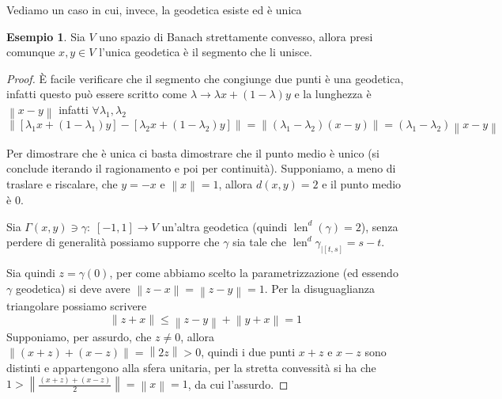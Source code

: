 \documentclass[a4paper,10pt]{article}
\newcounter{counter1}
\theoremstyle{plain}
\theoremstyle{definition}
\newtheorem{mydef}[counter1]{Definizione}
\newtheorem{myes}[counter1]{Esempio}
\theoremstyle{remark}
\newcommand{\pa}[1]{\left(#1\right)}
\newcommand{\bra}[1]{\left[#1\right]}
\newcommand{\norm}[1]{\left\|#1\right\|}
\DeclareMathOperator{\len}{len}
\begin{document}
Vediamo un caso in cui, invece, la geodetica esiste ed è unica
\begin{myes}
  Sia $V$ uno spazio di Banach strettamente convesso, allora presi
  comunque $x,y \in V$ l'unica geodetica è il segmento che li unisce.
\end{myes}
\begin{proof}
  È facile verificare che il segmento che congiunge due punti è una
  geodetica, infatti questo può essere scritto come $\lambda \to
  \lambda x + \pa{1 - \lambda} y$ e la lunghezza è $\norm{x-y}$
  infatti $\forall \lambda _1, \lambda _2$
  \[ \norm{ \bra{ \lambda _1 x + \pa{ 1 - \lambda _1} y } - \bra{
      \lambda _2 x + \pa{ 1 - \lambda _2} y } } = \norm{\pa{\lambda _1
      - \lambda _2 } \pa{ x - y}} = \pa{ \lambda _1 - \lambda _2}
  \norm { x -y} \]

  Per dimostrare che è unica ci basta dimostrare che il punto medio è
  unico (si conclude iterando il ragionamento e poi per
  continuità). Supponiamo, a meno di traslare e riscalare, che $y =
  -x$ e $\norm{x} = 1$, allora $d(x,y) = 2$ e il punto medio è $0$.

  Sia $\Gamma(x,y) \ni \gamma :\; \bra{-1,1} \to V$ un'altra geodetica
  (quindi $\len ^d (\gamma) = 2$), senza perdere di generalità
  possiamo supporre che $\gamma$ sia tale che $\len ^d \gamma_{\mid
    \bra{t,s}} = s -t$.

  Sia quindi $z = \gamma(0)$, per come abbiamo scelto la
  parametrizzazione (ed essendo $\gamma$ geodetica) si deve avere
  $\norm{z-x} = \norm{z-y} = 1$. Per la disuguaglianza triangolare
  possiamo scrivere
  \[ \norm{z+x} \le \norm{z-y} + \norm{y+x} = 1 \]
  Supponiamo, per assurdo, che $z \neq 0$, allora $\norm{\pa{x+z} +
    \pa{x-z}} = \norm{2z} >0$, quindi i due punti $x+z$ e $x-z$ sono
  distinti e appartengono alla sfera unitaria, per la stretta
  convessità si ha che $1 > \norm{\frac{(x+z) + (x-z)}{2} } = \norm{x}
  = 1$, da cui l'assurdo.
\end{proof}





\end{document}
